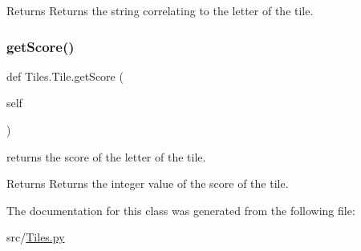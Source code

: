 \begin{DoxyReturn}{Returns}
Returns the string correlating to the letter of the tile. 
\end{DoxyReturn}
\mbox{\label{class_tiles_1_1_tile_a7075f9bb45ff42ff9076aecf2df07a3c}} 
\subsubsection{\texorpdfstring{get\+Score()}{getScore()}}
{\footnotesize\ttfamily def Tiles.\+Tile.\+get\+Score (\begin{DoxyParamCaption}\item[{}]{self }\end{DoxyParamCaption})}



returns the score of the letter of the tile. 

\begin{DoxyReturn}{Returns}
Returns the integer value of the score of the tile. 
\end{DoxyReturn}


The documentation for this class was generated from the following file\+:\begin{DoxyCompactItemize}
\item 
src/\hyperlink{_tiles_8py}{Tiles.\+py}\end{DoxyCompactItemize}
